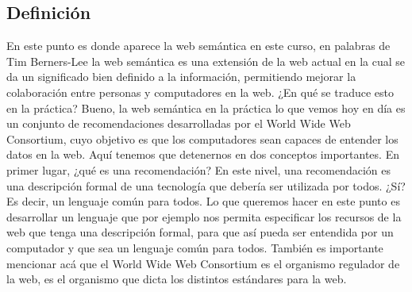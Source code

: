 \subsection{Definición}






En este punto es donde aparece la web semántica en este curso, en palabras de Tim Berners-Lee la web semántica es una extensión de la web actual en la cual se da un significado bien definido a la información, permitiendo mejorar la colaboración entre personas y computadores en la web. ¿En qué se traduce esto en la práctica? Bueno, la web semántica en la práctica lo que vemos hoy en día es un conjunto de recomendaciones desarrolladas por el World Wide Web Consortium, cuyo objetivo es que los computadores sean capaces de entender los datos en la web. Aquí tenemos que detenernos en dos conceptos importantes. En primer lugar, ¿qué es una recomendación? En este nivel, una recomendación es una descripción formal de una tecnología que debería ser utilizada por todos. ¿Sí? Es decir, un lenguaje común para todos. Lo que queremos hacer en este punto es desarrollar un lenguaje que por ejemplo nos permita especificar los recursos de la web que tenga una descripción formal, para que así pueda ser entendida por un computador y que sea un lenguaje común para todos. También es importante mencionar acá que el World Wide Web Consortium es el organismo regulador de la web, es el organismo que dicta los distintos estándares para la web.


